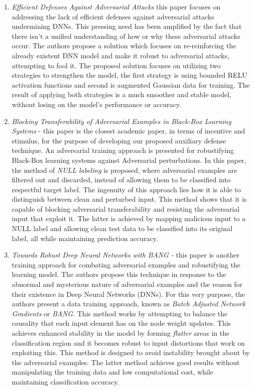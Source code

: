 \documentclass[grad,lot,lof,11pt,oneside,onehalfspace]{RUthesis}
\begin{document}
\begin{enumerate}
	\item \textit{Efficient Defenses Against Adversarial Attacks} this paper focuses on addressing the lack of efficient defenses against adversarial attacks undermining DNNs. This pressing need has been amplified by the fact that there isn't a unified understanding of how or why these adversarial attacks occur. The authors propose a solution which focuses on re-reinforcing the already existent DNN model and make it robust to adversarial attacks, attempting to fool it. The proposed solution focuses on utilizing two strategies to strengthen the model, the first strategy is using bounded RELU activation functions and second is augmented Gaussian data for training. The result of applying both strategies is a much smoother and stable model, without losing on the model's performance or accuracy.   
	\item \textit{Blocking Transferability of Adversarial Examples in Black-Box Learning Systems} - this paper \cite{hosseini_blocking_2017} is the closest academic paper, in terms of incentive and stimulus, for the purpose of developing our proposed auxiliary defense technique. An adversarial training approach is presented for robustifying Black-Box learning systems against Adversarial perturbations.  In this paper, the method of \textit{NULL labeling} is proposed, where adversarial examples are filtered out and discarded, instead of allowing them to be classified into respectful target label. The ingenuity of this approach lies how it is able to distinguish between clean and perturbed input. This method shows that it is capable of blocking adversarial transferability and resisting the adversarial input that exploit it. The latter is achieved  by mapping malicious input to a NULL label and allowing clean test data to be classified into its original label, all while maintaining prediction accuracy.
	\item \textit{Towards Robust Deep Neural Networks with BANG - } this paper \cite{rozsa_towards_2016} is another training approach for combating adversarial examples and robustifying the learning model. The authors propose this technique in response to the abnormal and mysterious nature of adversarial examples and the reason for their existence in Deep Neural Networks (DNNs). For this very purpose, the authors present a data training approach, known as \textit{Batch Adjusted Network Gradients} or \textit{BANG}. This method works by attempting to balance the causality that each input element has on the node weight updates. This achieves enhanced stability in the model by forming \textit{flatter} areas in the classification region and it becomes robust to input distortions that work on exploiting this. This method is designed to avoid instability brought about by the adversarial examples. The latter method achieves good results without manipulating the training data and low computational cost, while maintaining classification accuracy. 

\end{enumerate}
\end{document}
